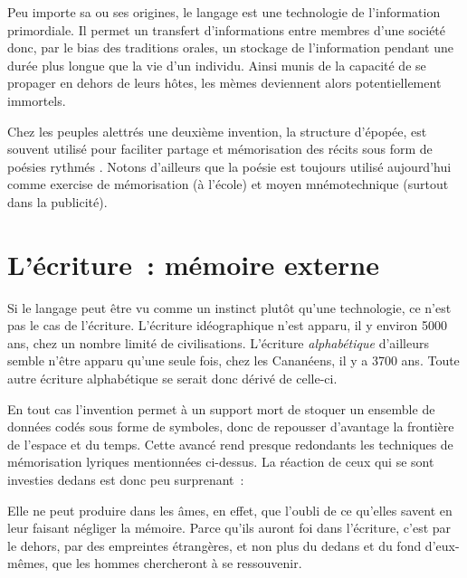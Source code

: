 Peu importe sa ou ses origines, le langage est une technologie de l'information primordiale. Il permet un transfert d'informations entre membres d'une société donc, par le bias des traditions orales, un stockage de l'information pendant une durée plus longue que la vie d'un individu. Ainsi munis de la capacité de se propager en dehors de leurs hôtes, les mèmes deviennent alors potentiellement immortels.

Chez les peuples alettrés une deuxième invention, la structure d'épopée, est souvent utilisé pour faciliter partage et mémorisation des récits sous form de poésies rythmés \cite{havelock-preface-plato}. Notons d'ailleurs que la poésie est toujours utilisé aujourd'hui comme exercise de mémorisation (à l'école) et moyen mnémotechnique (surtout dans la publicité).

\chapter{L'écriture~: mémoire externe}
Si le langage peut être vu comme un instinct plutôt qu'une technologie, ce n'est pas le cas de l'écriture. L'écriture idéographique n'est apparu, il y environ 5000 ans, chez un nombre limité de civilisations. L'écriture \emph{alphabétique} d'ailleurs semble n'être apparu qu'une seule fois, chez les Cananéens, il y a 3700 ans\cite{linguistics-pinker}. Toute autre écriture alphabétique se serait donc dérivé de celle-ci.

En tout cas l'invention permet à un support mort de stoquer un ensemble de données codés sous forme de symboles, donc de repousser d'avantage la frontière de l'espace et du temps. Cette avancé rend presque redondants les techniques de mémorisation lyriques mentionnées ci-dessus. La réaction de ceux qui se sont investies dedans est donc peu surprenant~:

\begin{coolquote}
Elle ne peut produire dans les âmes, en effet, que l’oubli de ce qu’elles  savent en leur faisant négliger la mémoire. Parce qu’ils auront foi dans  l’écriture, c’est par le dehors, par des empreintes étrangères, et non plus du dedans et du fond d’eux-mêmes, que les hommes chercheront à se ressouvenir. 
\end{coolquote}


